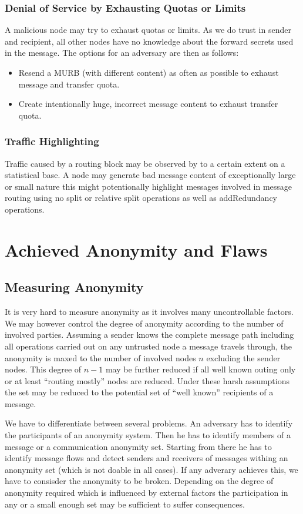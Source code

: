 \subsubsection{Denial of Service by Exhausting Quotas or Limits}
A malicious node may try to exhaust quotas or limits. As we do trust in sender and recipient, all other nodes have no knowledge about the forward secrets used in the message. The options for an adversary are then as follows:

\begin{itemize}
	\item Resend a MURB (with different content) as often as possible to exhaust message and transfer quota.
	\item Create intentionally huge, incorrect message content to exhaust transfer quota.
\end{itemize}

\subsubsection{Traffic Highlighting}
Traffic caused by a routing block may be observed by to a certain extent on a statistical base. A node may generate bad message content of exceptionally large or small nature this might potentionally highlight messages involved in message routing using no split or relative split operations as well as addRedundancy operations.

\section{Achieved Anonymity and Flaws}
\subsection{Measuring Anonymity}
It is very hard to measure anonymity as it involves many uncontrollable factors. We may however control the degree of anonymity according to the number of involved parties. Assuming a sender knows the complete message path including all operations carried out on any untrusted node a message travels through, the anonymity is maxed to  the number of involved nodes $n$ excluding the sender nodes. This degree of $n-1$ may be further reduced if all well known outing only or at least ``routing mostly'' nodes are reduced. Under these harsh assumptions the set may be reduced to the potential set of ``well known'' recipients of a message.

We have to differentiate between several problems. An adversary has to identify the participants of an anonymity system. Then he has to identify members of a message or a communication anonymity set. Starting from there he has to identify message flows and detect senders and receivers of messages withing an anonymity set (which is not doable in all cases). If any adverary achieves this, we have to consisder the anonymity to be broken. Depending on the degree of anonymity required which is influenced by external factors the participation in any or a small enough set may be sufficient to suffer consequences.

